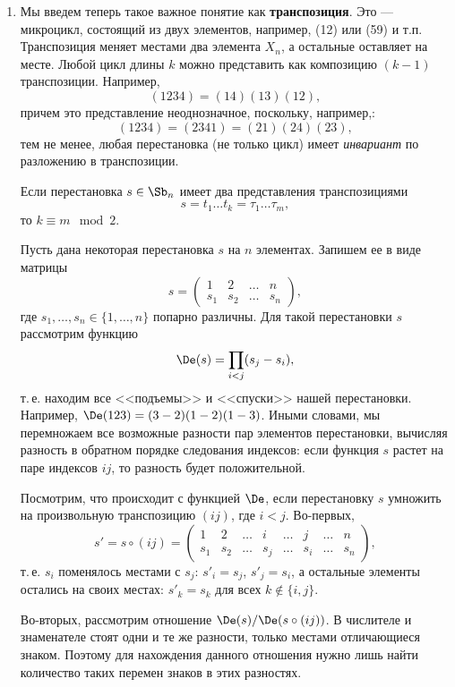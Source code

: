 \begin{enumerate}
\item Мы введем теперь такое важное понятие как \textbf{транспозиция}. Это --- микроцикл, состоящий из двух элементов, например, (12) или (59) и т.п. Транспозиция меняет местами два элемента $X_n$, а остальные оставляет на месте. Любой цикл длины $k$ можно представить как композицию $(k-1)$ транспозиции. Например,\label{transpose}
$$
(1234) = (14)(13)(12),
$$
причем это представление неоднозначное, поскольку, например,:
$$
(1234) = (2341) = (21)(24)(23),
$$
тем не менее, любая перестановка (не только цикл) имеет \textit{инвариант} по разложению в транспозиции.
\begin{thrm}
Если перестановка $s\in\Sb_n$ имеет два представления транспозициями
$$
s=t_1\dots t_k=\tau_1\dots\tau_m,
$$
то $k\equiv m\mod 2$.
\end{thrm}
\pf
Пусть дана некоторая перестановка $s$ на $n$ элементах. Запишем ее в виде матрицы
$$
s=\begin{pmatrix}
1 & 2 & \dots & n \\
s_1 & s_2 & \dots & s_n
\end{pmatrix},
$$
где $s_1,\dots, s_n\in\{1,\dots,n\}$ попарно различны. Для такой перестановки $s$ рассмотрим функцию
\begin{equation}\label{DeltaS}
\De(s) = \prod_{i<j}(s_j-s_i),
\end{equation}
т.\,е. находим все <<подъемы>> и <<спуски>> нашей перестановки. Например, $\De(123)=(3-2)(1-2)(1-3)$. Иными словами, мы перемножаем все возможные разности пар элементов перестановки, вычисляя разность в обратном порядке следования индексов: если функция $s$ растет на паре индексов $ij$, то разность будет положительной.

Посмотрим, что происходит с функцией $\De$, если перестановку $s$ умножить на произвольную транспозицию $(ij)$, где $i<j$. Во-первых,
$$
s' = s\circ (ij) = \begin{pmatrix}
1 & 2 & \dots & i & \dots & j & \dots & n \\
s_1 & s_2 & \dots & s_j & \dots & s_i & \dots & s_n
\end{pmatrix},
$$
т.\,е. $s_i$ поменялось местами с $s_j$: $s'_i=s_j$, $s'_j=s_i$, а остальные элементы остались на своих местах: $s'_k=s_k$ для всех $k\notin\{i,j\}$. 

Во-вторых, рассмотрим отношение $\De(s)/\De(s\circ(ij))$. В числителе и знаменателе стоят одни и те же разности, только местами отличающиеся знаком. Поэтому для нахождения данного отношения нужно лишь найти количество таких перемен знаков в этих разностях.


\end{enumerate}
